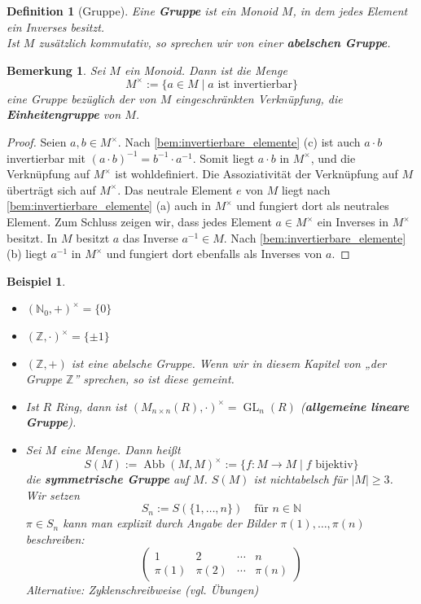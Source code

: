 \documentclass[a4paper, twoside, 11pt, ngerman]{report}
\newcommand{\NN}{\mathds N}
\newcommand{\ZZ}{\mathds Z}
\DeclareMathOperator{\Abb}{Abb}
\DeclareMathOperator{\GL}{GL}
\theoremstyle{definistyle}
\newtheorem{defini}[satz]{Definition}
\newtheorem{bem}[satz]{Bemerkung}
\newtheorem{bsp}[satz]{Beispiel}
\theoremstyle{remark}
\newcommand{\defn}[1]{\textit{\bfseries #1}}
\begin{document}
\begin{defini}[Gruppe]\label{def:gruppe}
Eine \defn{Gruppe} ist ein Monoid $ M $, in dem jedes Element ein Inverses besitzt.\\
Ist $ M $ zusätzlich kommutativ, so sprechen wir von einer \defn{abelschen Gruppe}.
\end{defini}

\begin{bem}\label{bem:einheitengruppe}
Sei $ M $ ein Monoid. Dann ist die Menge
\[
M^{\times} := \{ a \in M \mid a \text{ ist invertierbar} \}
\]
eine Gruppe bezüglich der von $M$ eingeschränkten Verknüpfung, die \defn{Einheitengruppe} von $ M $.
\end{bem}


\begin{proof}
Seien $ a, b \in M^{\times} $. Nach \ref{bem:invertierbare_elemente} (c) ist auch $ a \cdot b $ invertierbar mit $(a \cdot b)^{-1} = b^{-1} \cdot a^{-1}$. Somit liegt $ a \cdot b $ in $ M^{\times} $, und die Verknüpfung auf $M^\times$ ist wohldefiniert. Die Assoziativität der Verknüpfung auf $M$ überträgt sich auf $ M^{\times} $. Das neutrale Element $ e $ von $ M $ liegt nach \ref{bem:invertierbare_elemente} (a) auch in $ M^{\times} $ und fungiert dort als neutrales Element.
Zum Schluss zeigen wir, dass jedes Element $a\in M^{\times} $ ein Inverses in $M^\times$ besitzt. In $M$ besitzt $a$ das Inverse $ a^{-1}\in M$. Nach \ref{bem:invertierbare_elemente} (b) liegt $ a^{-1} $ in $ M^{\times} $ und fungiert dort ebenfalls als Inverses von $a$.
\end{proof}


\begin{bsp}\label{bsp:einheitengruppe_weiter}
\begin{itemize}
    \item[(a)] $ (\NN_0, +)^{\times} = \{ 0 \} $
    \item[(b)] $ (\ZZ, \cdot)^{\times} = \{ \pm 1 \} $
    \item[(c)] $ (\ZZ, +) $ ist eine abelsche Gruppe. Wenn wir in diesem Kapitel von „der Gruppe $\ZZ$” sprechen, so ist diese gemeint.
    \item[(d)] Ist $ R $ Ring, dann ist $ (M_{n \times n}(R), \cdot)^{\times} = \GL_n(R) $ (\defn{allgemeine lineare Gruppe}).
    \item[(e)] Sei $ M $ eine Menge. Dann heißt
    \[ S(M) := \Abb(M, M)^{\times} := \{ f: M \to M \mid f \text{ bijektiv} \} \] die \defn{symmetrische Gruppe} auf $ M $. $ S(M) $ ist nichtabelsch für $ |M| \geq 3 $. Wir setzen
\[
S_n := S(\{ 1, \dots, n \}) \quad \text{für } n \in \NN
\]
$ \pi \in S_n $ kann man explizit durch Angabe der Bilder $ \pi(1), \dots, \pi(n) $ beschreiben:
\[
\begin{pmatrix} 1 & 2 & \cdots & n \\ \pi(1) & \pi(2) & \cdots & \pi(n) \end{pmatrix}
\]
Alternative: Zyklenschreibweise (vgl. Übungen)
\end{itemize}
\end{bsp}
\end{document}
